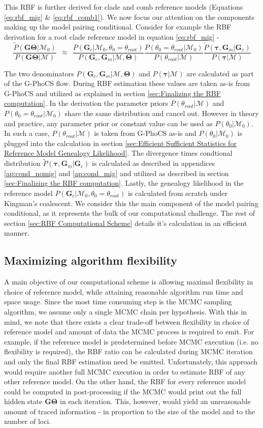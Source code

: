 \documentclass[11pt]{article}
\newcommand{\vect}[1]{\boldsymbol{\mathbf{#1}}}
\newcommand{\M}{\mathcal{M}}
\newcommand{\G}{\vect{G}}
\newcommand{\T}{\vect{\Theta}}
\newcommand{\GT}{\G\T}
\newcommand{\Pref}{\widetilde{P}}
\newcommand{\1}{\mathbbm{1}}
\newcommand{\troot}{\theta_{root}}
\newcommand{\Gc}{\G_c}
\newcommand{\Gm}{\G_m}
\newcommand{\gp}{G-PhoCS }
\newcommand{\taus}{\vect\tau}
\begin{document}
This RBF is further derived for clade and comb reference models (Equations  \ref{eq:rbf_mig} \& \ref{eq:rbf_comb1}). 
%
We now focus our attention on the components making up the model pairing conditional. Consider for example the RBF derivation for a root clade reference model in equation \ref{eq:rbf_mig} - 
\[ 
	\frac{\Pref(\GT|\M_0) }{P(\GT|\M)}
	~~\approx~~ 
	\frac{ P(\Gc|\M_0,\theta_0=\troot) }{ P(\Gc,\Gm|\M,\T)} 
	\frac{ P(\theta_0=\troot|\M_0)}{P(\troot|\M)}
	\frac{ \Pref(\taus,\Gm|\Gc)}{P(\taus|\M)}
\]

The two denominators $P(\Gc,\Gm|\M,\T)$ and $P(\taus|\M)$ are calculated as part of the \gp flow.
%
During RBF estimation these values are taken as-is from \gp and utilized as explained in section \ref{sec:Finalizing the RBF computation}.
%
%
In the derivation the parameter priors $P(\troot|\M)$ and $P(\theta_0=\troot|\M_0)$ share the same distribution and cancel out.
%
However in theory and practice, any parameter prior or constant value can be used as $P(\theta_0|\M_0)$.
%
In such a case, $P(\troot|\M)$ is taken from \gp as-is and $P(\theta_0|\M_0)$ is plugged into the calculation in section \ref{sec:Efficient Sufficient Statistics for Reference Model Genealogy Likelihood}.
%
%
The divergence times condtional distribution $\Pref(\taus,\Gm|\Gc)$ is calculated as described in appendices \ref{ap:cond_nomig} and \ref{ap:cond_mig} and utilized as described in section \ref{sec:Finalizing the RBF computation}.
%
Lastly, the genealogy likelihood in the reference model $P(\Gc|\M_0,\theta_0=\troot)$ is calculated from scratch under Kingman's coalescent. 
%
We consider this the main component of the model pairing conditional, as it represents the bulk of our computational challenge. The rest of section \ref{sec:RBF Computational Scheme} details it's calculation in an efficient manner.

\subsection{Maximizing algorithm flexibility}

A main objective of our computational scheme is allowing maximal flexibility in choice of reference model, while attaining reasonable algorithm run time and space usage.
%
Since the most time consuming step is the MCMC sampling algorithm, we assume only a single MCMC chain per hypothesis.
%
With this in mind, we note that there exists a clear trade-off between flexibility in choice of reference model and amount of data the MCMC process is required to emit. 
%
For example, if the reference model is predetermined before MCMC execution (i.e. no flexibility is required), the RBF ratio can be calculated during MCMC iteration and only the final RBF estimation need be emitted.
%
Unfortunately, this approach would require another full MCMC execution in order to estimate RBF of any other reference model.
%
On the other hand, the RBF for every reference model could be computed in post-processing if the MCMC would print out the full hidden state $\GT$ in each iteration.
%
This, however, would yield an unreasonable amount of traced information - in proportion to the size of the model and to the number of loci.
\end{document}
